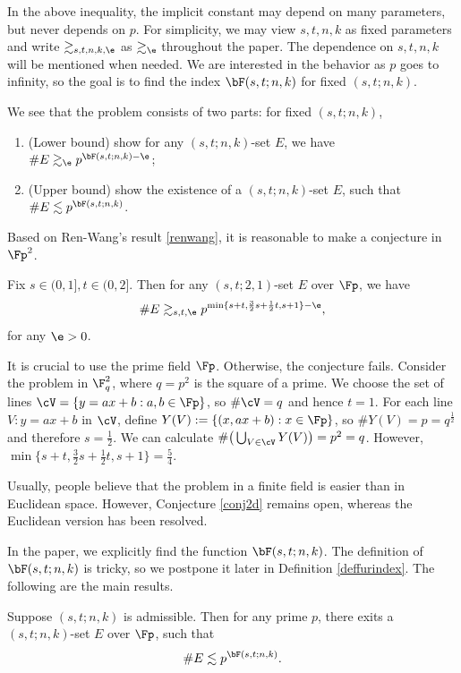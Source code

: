 In the above inequality, the implicit constant may depend on many parameters, but never depends on $p$. For simplicity, we may view $s,t,n,k$ as fixed parameters and write $\gtrsim_{s,t,n,k,\e}$ as $\gtrsim_\e$ throughout the paper. The dependence on $s,t,n,k$ will be mentioned when needed. 
We are interested in the behavior as $p$ goes to infinity, so the goal is to find the index $\bF(s,t;n,k)$ for fixed $(s,t;n,k)$.

We see that the problem consists of two parts:
for fixed $(s,t;n,k)$,
\begin{enumerate}
    \item (Lower bound) show for any $(s,t;n,k)$-set $E$, we have $\#E\gtrsim_{\e} p^{\bF(s,t;n,k)-\e}$;
    \item (Upper bound) show the existence of a $(s,t;n,k)$-set $E$, such that $\#E\lesssim p^{\bF(s,t;n,k)}$.
\end{enumerate}

\medskip

Based on Ren-Wang's result \eqref{renwang}, it is reasonable to make a conjecture in $\Fp^2$.

\begin{conjecture}\label{conj2d}
    Fix $s\in(0,1],t\in (0,2]$. Then for any $(s,t;2,1)$-set $E$ over $\Fp$, we have
    \[ \#E\gtrsim_{s,t,\e} p^{\min\{s+t,\frac{3}{2}s+\frac{1}{2}t,s+1  \}-\e}, \]
    for any $\e>0$.
\end{conjecture}

\begin{remark}
{\rm
    It is crucial to use the prime field $\Fp$. Otherwise, the conjecture fails. Consider the problem in $\F_q^2$, where $q=p^2$ is the square of a prime. We choose the set of lines $\cV=\{y=ax+b: a,b\in \Fp\}$, so $\#\cV=q$ and hence $t=1$. For each line $V: y=ax+b$ in $\cV$, define $Y(V):=\{(x,ax+b):x\in\Fp\}$, so $\#Y(V)=p=q^{\frac12}$ and therefore $s=\frac12$. We can calculate $\#\big(\bigcup_{V\in\cV}Y(V)\big)=p^2=q$. However, $\min\{s+t,\frac32s+\frac12t,s+1\}=\frac54$.

    Usually, people believe that the problem in a finite field is easier than in Euclidean space. However, Conjecture \ref{conj2d} remains open, whereas the Euclidean version has been resolved.
}
\end{remark}

\bigskip


In the paper, we explicitly find the function $\bF(s,t;n,k)$. The definition of $\bF(s,t;n,k)$ is tricky, so we postpone it later in Definition \ref{deffurindex}. The following are the main results.


\begin{theorem}\label{upper bound}
    Suppose $(s,t;n,k)$ is admissible. Then for any prime $p$, there exits a $(s,t;n,k)$-set $E$ over $\Fp$, such that
    \[ \#E\lesssim p^{\bF(s,t;n,k)}. \] 
\end{theorem}
